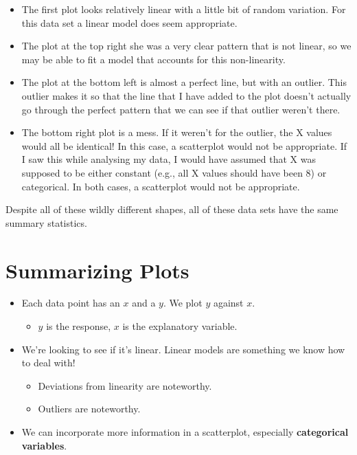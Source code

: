 \documentclass[
  letterpaper,
  DIV=11,
  numbers=noendperiod]{scrreprt}
\providecommand{\tightlist}{%
  \setlength{\itemsep}{0pt}\setlength{\parskip}{0pt}}\usepackage{longtable,booktabs,array}
\begin{document}
\begin{itemize}
\tightlist
\item
  The first plot looks relatively linear with a little bit of random
  variation. For this data set a linear model does seem appropriate.
\item
  The plot at the top right she was a very clear pattern that is not
  linear, so we may be able to fit a model that accounts for this
  non-linearity.
\item
  The plot at the bottom left is almost a perfect line, but with an
  outlier. This outlier makes it so that the line that I have added to
  the plot doesn't actually go through the perfect pattern that we can
  see if that outlier weren't there.
\item
  The bottom right plot is a mess. If it weren't for the outlier, the X
  values would all be identical! In this case, a scatterplot would not
  be appropriate. If I saw this while analysing my data, I would have
  assumed that X was supposed to be either constant (e.g., all X values
  should have been 8) or categorical. In both cases, a scatterplot would
  not be appropriate.
\end{itemize}

Despite all of these wildly different shapes, all of these data sets
have the same summary statistics.

\hypertarget{summarizing-plots}{%
\section{Summarizing Plots}\label{summarizing-plots}}

\begin{itemize}
\tightlist
\item
  Each data point has an \(x\) and a \(y\). We plot \(y\) against \(x\).

  \begin{itemize}
  \tightlist
  \item
    \(y\) is the response, \(x\) is the explanatory variable.\lspace
  \end{itemize}
\item
  We're looking to see if it's linear. Linear models are something we
  know how to deal with!

  \begin{itemize}
  \tightlist
  \item
    Deviations from linearity are noteworthy.
  \item
    Outliers are noteworthy.\lspace
  \end{itemize}
\item
  We can incorporate more information in a scatterplot, especially
  \textbf{categorical variables}.
\end{itemize}
\end{document}
